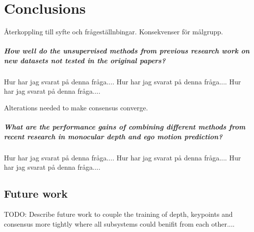 \chapter{Conclusions}\label{cha:conclusions}

Återkoppling till syfte och frågeställnbingar. Konsekvenser för målgrupp.

\paragraph{\textbf{How well do the unsupervised methods from previous research work on new datasets not tested in the original papers?}} Hur har jag svarat på denna fråga.... Hur har jag svarat på denna fråga.... Hur har jag svarat på denna fråga....

Alterations needed to make consensus converge.


\paragraph{\textbf{What are the performance gains of combining different methods from recent research in monocular depth and ego motion prediction?}} Hur har jag svarat på denna fråga.... Hur har jag svarat på denna fråga.... Hur har jag svarat på denna fråga....

\section{Future work}

TODO: Describe future work to couple the training of depth, keypoints and consensus more tightly where all subsystems could benifit from each other....